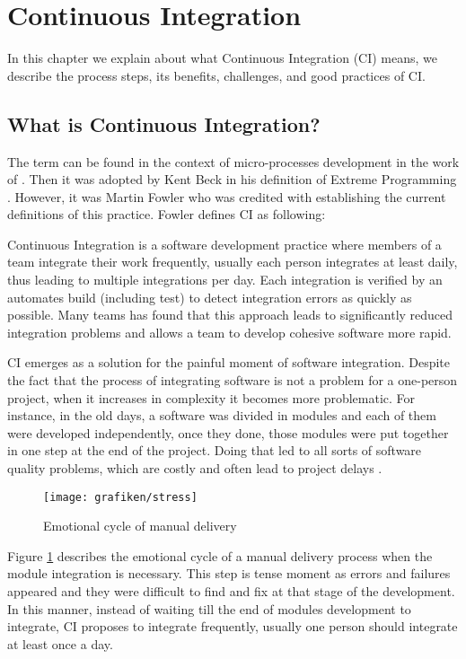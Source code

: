 \section{Continuous Integration}
\label{chap:ci}
In this chapter we explain about what Continuous Integration (CI) means, we describe the process steps, its benefits, challenges, and good practices of CI.

\subsection{What is Continuous Integration?}
\label{sec:ci-def}
The term can be found in the context of micro-processes development in the work of \citeauthor{Booch2007}. Then it was adopted by Kent Beck in his definition of Extreme Programming \cite{Beck1999}. However, it was Martin Fowler who was credited with establishing the current definitions of this practice. Fowler defines CI as following:

Continuous Integration is a software development practice where members of a team integrate their work frequently, usually each person integrates at least daily, thus leading to multiple integrations per day. Each integration is verified by an automates build (including test) to detect integration errors as quickly as possible. Many teams has found that this approach leads to significantly reduced integration problems and allows a team to develop cohesive software more rapid\cite{Fowler2006}.

CI emerges as a solution for the painful moment of software integration. Despite the fact that the process of integrating software is not a problem for a one-person project, when it increases in complexity it becomes more problematic. For instance, in the old days, a software was divided in modules and each of them were developed independently, once they done, those modules were put together in one step at the end of the project. Doing that led to all sorts of software quality problems, which are costly and often lead to project delays \cite{Duvall2007}.

\begin{figure}[ht]
	\centering
    \texttt{[image: grafiken/stress]}
    \caption{Emotional cycle of manual delivery \cite{Goff2015}}
    \label{fig:emotional}
\end{figure}

Figure \ref{fig:emotional} describes the emotional cycle of a manual delivery process\cite{Goff2015} when the module integration is necessary. This step is tense moment as errors and failures appeared and they were difficult to find and fix at that stage of the development. In this manner, instead of waiting till the end of modules development to integrate, CI proposes to integrate frequently, usually one person should integrate at least once a day.

